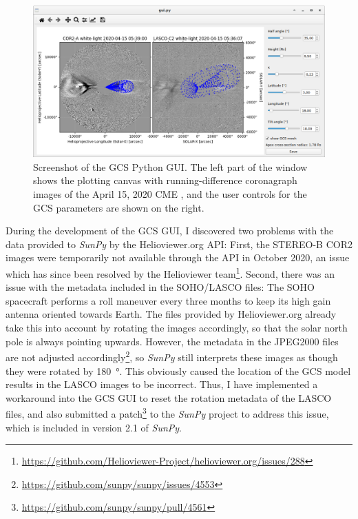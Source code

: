 \begin{figure}
	\centering
	\includegraphics[width=\textwidth]{images/gcs_screenshot.png}
	\caption[Screenshot of the \acs{GCS} Python \acs{GUI}]{Screenshot of the \ac{GCS} Python \ac{GUI}. The left part of the window shows the plotting canvas with running-difference coronagraph images of the April 15, 2020 \ac{CME} \citep[see][]{Forstner-2021-SolO}, and the user controls for the \ac{GCS} parameters are shown on the right.}
	\label{fig:gcs_screenshot}
\end{figure}

During the development of the \ac{GCS} \ac{GUI}, I discovered two problems with the data provided to \textit{SunPy} by the Helioviewer.org API: First, the \ac{STEREO}-B COR2 images were temporarily not available through the API in October 2020, an issue which has since been resolved by the Helioviewer team\footnote{\url{https://github.com/Helioviewer-Project/helioviewer.org/issues/288}}. Second, there was an issue with the metadata included in the \ac{SOHO}/LASCO files: The \ac{SOHO} spacecraft performs a roll maneuver every three months to keep its high gain antenna oriented towards Earth. The files provided by Helioviewer.org already take this into account by rotating the images accordingly, so that the solar north pole is always pointing upwards. However, the metadata in the JPEG2000 files are not adjusted accordingly\footnote{\url{https://github.com/sunpy/sunpy/issues/4553}}, so \textit{SunPy} still interprets these images as though they were rotated by \SI{180}{\degree}. This obviously caused the location of the \ac{GCS} model results in the LASCO images to be incorrect. Thus, I have implemented a workaround into the \ac{GCS} \ac{GUI} to reset the rotation metadata of the LASCO files, and also submitted a patch\footnote{\url{https://github.com/sunpy/sunpy/pull/4561}} to the \textit{SunPy} project to address this issue, which is included in version 2.1 of \textit{SunPy}.

